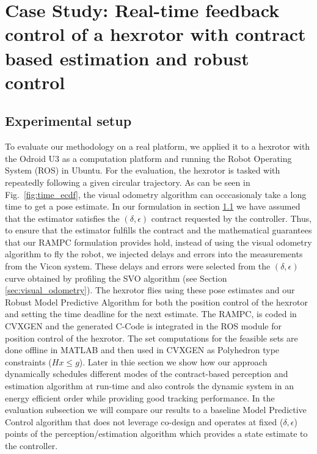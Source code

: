 \section{Case Study: Real-time feedback control of a hexrotor with contract based estimation and robust control}
\label{sec:experiments}

\subsection{Experimental setup}
To evaluate our methodology on a real platform, we applied it to a hexrotor with the Odroid U3 as a computation platform and running the Robot Operating System (ROS) in Ubuntu. For the evaluation, the hexrotor is tasked with  repeatedly following a given circular trajectory.
As can be seen in Fig.~\ref{fig:time_ecdf}, the visual odometry algorithm can occcasionaly take a long time to get a pose estimate. In our formulation in section \ref{} we have assumed that the estimator satisfies the $(\delta, \epsilon)$ contract requested by the controller. Thus, to ensure that the estimator fulfills the contract and the mathematical guarantees that our RAMPC formulation provides hold, instead of using the visual odometry algorithm to fly the robot, we injected delays and errors into the measurements from the Vicon system. These delays and errors were selected from the $(\delta,\epsilon)$ curve obtained by profiling the SVO algorithm (see Section \ref{sec:visual_odometry}).
The hexrotor flies using these pose estimates and our Robust Model Predictive Algorithm for both the position control of the hexrotor and setting the time deadline for the next estimate. The RAMPC, is coded in CVXGEN \cite{} and the generated C-Code is integrated in the ROS module for position control of the hexrotor. The set computations for the feasible sets are done offline in MATLAB and then used in CVXGEN as Polyhedron type constraints ($Hx \le g$). 
Later in thie section we show how our approach dynamically schedules different modes of the contract-based perception and estimation algorithm at run-time and also controls the dynamic system in an energy efficient order while providing good tracking performance. In the evaluation subsection we will compare our results to a baseline Model Predictive Control algorithm that does not leverage co-design and operates at fixed ($\delta,\epsilon$) points of the perception/estimation algorithm which provides a state estimate to the controller.

